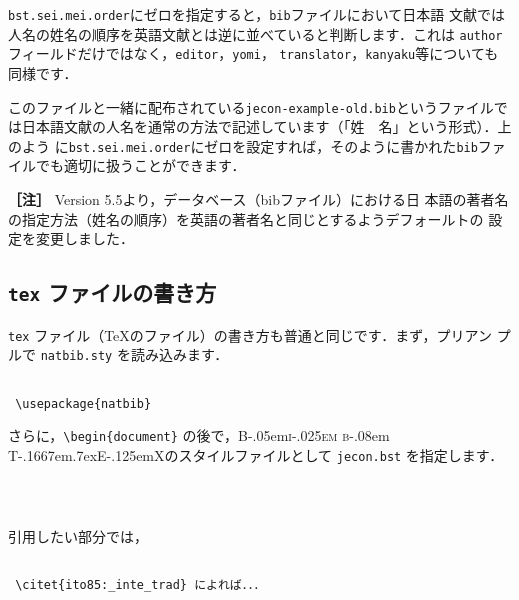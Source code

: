 \documentclass[article]{jlreq}
\newcommand{\BibTeX}{\textrm{B\kern-.05em\textsc{i\kern-.025em b}\kern-.08em%
T\kern-.1667em\lower.7ex\hbox{E}\kern-.125emX}}
\newcommand{\midashii}[1]{\noindent \textbf{［#1］}}
\begin{document}
\texttt{bst.sei.mei.order}にゼロを指定すると，\texttt{bib}ファイルにおいて日本語
文献では人名の姓名の順序を英語文献とは逆に並べていると判断します．これは
\texttt{author}フィールドだけではなく，\texttt{editor}，\texttt{yomi}，
\texttt{translator}，\texttt{kanyaku}等についても同様です．
\vspace*{1em}

このファイルと一緒に配布されている\texttt{jecon-example-old.bib}というファイルで
は日本語文献の人名を通常の方法で記述しています（「姓　名」という形式）．上のよう
に\texttt{bst.sei.mei.order}にゼロを設定すれば，そのように書かれた\texttt{bib}ファ
イルでも適切に扱うことができます．

\vspace*{1em}

\midashii{注} Version 5.5より，データベース（bibファイル）における日
本語の著者名の指定方法（姓名の順序）を英語の著者名と同じとするようデフォールトの
設定を変更しました．


\subsection{\texttt{tex} ファイルの書き方}

\texttt{tex} ファイル（\TeX のファイル）の書き方も普通と同じです．まず，プリアン
プルで \texttt{natbib.sty} を読み込みます．

\begin{screen}
 \begin{verbatim}

 \usepackage{natbib}
 \end{verbatim}
\end{screen}

さらに，\verb|\begin{document}| の後で，\BibTeX のスタイルファイルとして 
\texttt{jecon.bst} を指定します．

\begin{screen}
 \begin{verbatim}

 
 \end{verbatim}
\end{screen}

引用したい部分では，

\begin{screen}
 \begin{verbatim}
        
 \citet{ito85:_inte_trad} によれば．．．
 \end{verbatim}
\end{screen}
\end{document}

